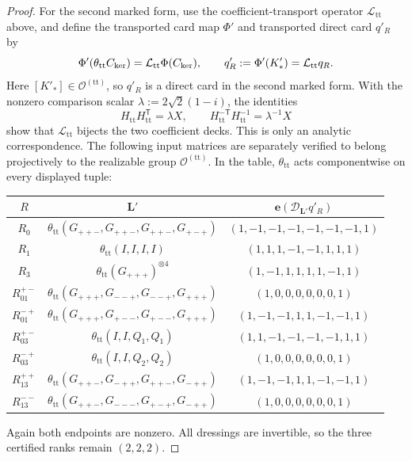 \documentclass[11pt,letterpaper,onecolumn]{article}
\theoremstyle{plain}
\theoremstyle{definition}
\theoremstyle{remark}
\newcommand{\OctTT}{{\mathcal O^{(\mathrm{tt})}}}
\begin{document}
\begin{proof}
For the second marked form, use the coefficient-transport operator
\(\mathcal L_{\mathrm{tt}}\) above, and define the transported card map
\(\Phi'\) and
transported direct card \(q'_R\) by
\[
  \Phi'(\theta_{\mathrm{tt}}C_{\rm ker})=\mathcal L_{\mathrm{tt}}\Phi(C_{\rm ker}),
  \qquad
  q'_R:=\Phi'(K'_*)=\mathcal L_{\mathrm{tt}}q_R.
\]
Here \([K'_*]\in\OctTT\), so \(q'_R\) is a direct card in the
second marked form.
With the nonzero comparison scalar \(\lambda:=2\sqrt2(1-i)\), the identities
\begin{equation*}
  H_{\mathrm{tt}}H_{\mathrm{tt}}^{\mathsf T}=\lambda X,
  \qquad
  H_{\mathrm{tt}}^{-\mathsf T}H_{\mathrm{tt}}^{-1}=\lambda^{-1}X
\end{equation*}
show that \(\mathcal L_{\mathrm{tt}}\) bijects the two coefficient decks.
This is only
an analytic correspondence.  The following input matrices are separately
verified to belong projectively to the realizable group \(\OctTT\). In the
table, \(\theta_{\mathrm{tt}}\) acts componentwise on every displayed tuple:
\begin{center}
\normalsize
\setlength{\tabcolsep}{4pt}
\begin{tabular}{ccc}
\toprule
\(R\)&\(\mathbf L'\)&\(\mathbf e(\mathscr D_{\mathbf L'}q'_R)\)\\
\midrule
\(R_0\)&\(\theta_{\mathrm{tt}}(G_{++-},G_{++-},G_{++-},G_{+-+})\)&
\((1,-1,-1,-1,-1,-1,-1,1)\)\\
\(R_1\)&\(\theta_{\mathrm{tt}}(I,I,I,I)\)&\((1,1,1,-1,-1,1,1,1)\)\\
\(R_3\)&\(\theta_{\mathrm{tt}}(G_{+++})^{\otimes4}\)&\((1,-1,1,1,1,1,-1,1)\)\\
\(R_{01}^{+-}\)&\(\theta_{\mathrm{tt}}(G_{+++},G_{--+},G_{--+},G_{+++})\)&
\((1,0,0,0,0,0,0,1)\)\\
\(R_{01}^{-+}\)&\(\theta_{\mathrm{tt}}(G_{+++},G_{+--},G_{+--},G_{+++})\)&
\((1,-1,-1,1,1,-1,-1,1)\)\\
\(R_{03}^{+-}\)&\(\theta_{\mathrm{tt}}(I,I,Q_1,Q_1)\)&\((1,1,-1,-1,-1,-1,1,1)\)\\
\(R_{03}^{-+}\)&\(\theta_{\mathrm{tt}}(I,I,Q_2,Q_2)\)&\((1,0,0,0,0,0,0,1)\)\\
\(R_{13}^{++}\)&\(\theta_{\mathrm{tt}}(G_{++-},G_{-++},G_{++-},G_{-++})\)&
\((1,-1,-1,1,1,-1,-1,1)\)\\
\(R_{13}^{--}\)&\(\theta_{\mathrm{tt}}(G_{++-},G_{---},G_{+-+},G_{-++})\)&
\((1,0,0,0,0,0,0,1)\)\\
\bottomrule
\end{tabular}
\end{center}
Again both endpoints are nonzero.  All dressings are invertible, so the
three certified ranks remain \((2,2,2)\).


\end{proof}
\end{document}

